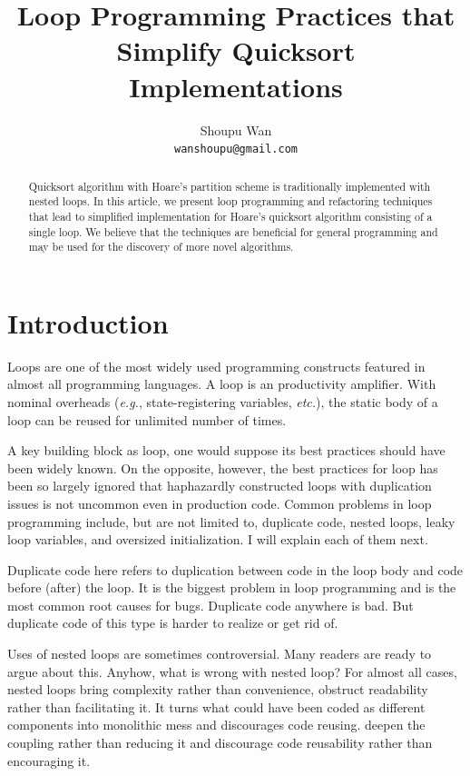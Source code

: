 \documentclass[a4paper,titlepage]{article}
\title{Loop Programming Practices that Simplify Quicksort Implementations}
\author{Shoupu Wan \\
\texttt{wanshoupu@gmail.com} \\
}
\begin{document}
    \maketitle

    \begin{abstract}
        Quicksort algorithm with Hoare's partition scheme is traditionally implemented with
        nested loops.
        In this article, we present loop programming and refactoring techniques
        that lead to simplified implementation for Hoare's quicksort algorithm consisting of a
        single loop.
        We believe that the techniques are beneficial for general programming and may be used for
        the discovery of more novel algorithms.
    \end{abstract}




    \section{Introduction}\label{sec:introduction}
    Loops are one of the most widely used programming constructs featured
    in almost all programming languages.
    A loop is an productivity amplifier.
    With nominal overheads (\textit{e.g.}, state-registering variables, \textit{etc.}),
    the static body of a loop can be reused for unlimited number of times.


    A key building block as loop, one would suppose its best practices should have been widely
    known.
    On the opposite, however, the best practices for loop has been so largely ignored that
    haphazardly constructed loops with duplication issues is not uncommon even in production code.
    Common problems in loop programming include, but are not limited to, duplicate code, nested
    loops, leaky loop variables, and oversized initialization.
    I will explain each of them next.


    Duplicate code here refers to duplication between code in the loop body and code before (after)
    the loop.
    It is the biggest problem in loop programming and is the most common root causes for bugs.
    Duplicate code anywhere is bad.
    But duplicate code of this type is harder to realize or get rid of.


    Uses of nested loops are sometimes controversial.
    Many readers are ready to argue about this.
    Anyhow, what is wrong with nested loop?
    For almost all cases, nested loops bring complexity rather than convenience,
    obstruct readability rather than facilitating it.
    It turns what could have been coded as different components into monolithic mess and
    discourages code reusing.
    deepen the coupling rather than reducing it and discourage code reusability rather than encouraging it.
\end{document}
